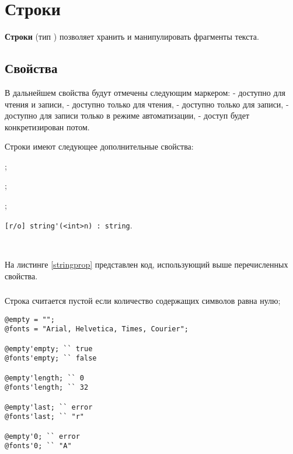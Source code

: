 \section{Строки}

{\bf Строки} (тип \str{}) позволяет хранить и манипулировать фрагменты текста. 

\subsection{Свойства}

В дальнейшем свойства будут отмечены следующим маркером: \code{[r/w]} - доступно для чтения и записи, \code{[r/o]} - доступно только для чтения, \code{[w/o]} - доступно только для записи,  \code{[r/*]} - доступно для записи только в режиме автоматизации, \code{[*/*]} - доступ будет конкретизирован потом.

Строки имеют следующее дополнительные свойства:
\begin{icItems}
\item
	;
\item
	;
\item
	;
\item
	\lstinline|[r/o] string'(<int>n) : string|.
\end{icItems}

\

На листинге \ref{stringprop} представлен код, использующий выше перечисленных свойства.

\subsubsection{}

Строка считается пустой если количество содержащих символов равна нулю;

\begin{lstlisting}[caption=Свойства класса string, label=stringprop]
@empty = "";
@fonts = "Arial, Helvetica, Times, Courier";

@empty'empty; `` true
@fonts'empty; `` false

@empty'length; `` 0
@fonts'length; `` 32

@empty'last; `` error
@fonts'last; `` "r"

@empty'0; `` error
@fonts'0; `` "A"
\end{lstlisting}

\subsubsection{}

